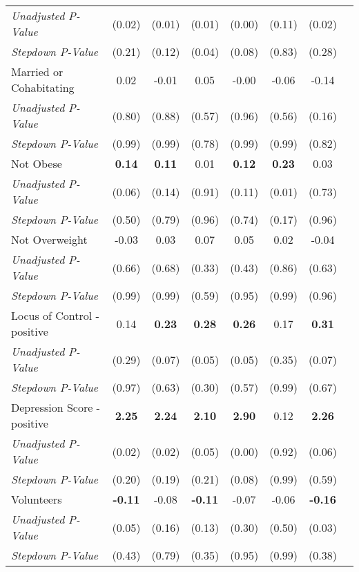 \begin{tabular}{l c c c c c c c}
\quad \textit{Unadjusted P-Value} & (0.02) & (0.01) & (0.01) & (0.00) & (0.11) & (0.02) \\
\quad \textit{Stepdown P-Value} & (0.21) & (0.12) & (0.04) & (0.08) & (0.83) & (0.28) \\
Married or Cohabitating & 0.02 & -0.01 & 0.05 & -0.00 & -0.06 & -0.14 \\
\quad \textit{Unadjusted P-Value} & (0.80) & (0.88) & (0.57) & (0.96) & (0.56) & (0.16) \\
\quad \textit{Stepdown P-Value} & (0.99) & (0.99) & (0.78) & (0.99) & (0.99) & (0.82) \\
Not Obese & \textbf{ 0.14 } & \textbf{ 0.11 } & 0.01 & \textbf{ 0.12 } & \textbf{ 0.23 } & 0.03 \\
\quad \textit{Unadjusted P-Value} & (0.06) & (0.14) & (0.91) & (0.11) & (0.01) & (0.73) \\
\quad \textit{Stepdown P-Value} & (0.50) & (0.79) & (0.96) & (0.74) & (0.17) & (0.96) \\
Not Overweight & -0.03 & 0.03 & 0.07 & 0.05 & 0.02 & -0.04 \\
\quad \textit{Unadjusted P-Value} & (0.66) & (0.68) & (0.33) & (0.43) & (0.86) & (0.63) \\
\quad \textit{Stepdown P-Value} & (0.99) & (0.99) & (0.59) & (0.95) & (0.99) & (0.96) \\
Locus of Control - positive & 0.14 & \textbf{ 0.23 } & \textbf{ 0.28 } & \textbf{ 0.26 } & 0.17 & \textbf{ 0.31 } \\
\quad \textit{Unadjusted P-Value} & (0.29) & (0.07) & (0.05) & (0.05) & (0.35) & (0.07) \\
\quad \textit{Stepdown P-Value} & (0.97) & (0.63) & (0.30) & (0.57) & (0.99) & (0.67) \\
Depression Score - positive & \textbf{ 2.25 } & \textbf{ 2.24 } & \textbf{ 2.10 } & \textbf{ 2.90 } & 0.12 & \textbf{ 2.26 } \\
\quad \textit{Unadjusted P-Value} & (0.02) & (0.02) & (0.05) & (0.00) & (0.92) & (0.06) \\
\quad \textit{Stepdown P-Value} & (0.20) & (0.19) & (0.21) & (0.08) & (0.99) & (0.59) \\
Volunteers & \textbf{ -0.11 } & -0.08 & \textbf{ -0.11 } & -0.07 & -0.06 & \textbf{ -0.16 } \\
\quad \textit{Unadjusted P-Value} & (0.05) & (0.16) & (0.13) & (0.30) & (0.50) & (0.03) \\
\quad \textit{Stepdown P-Value} & (0.43) & (0.79) & (0.35) & (0.95) & (0.99) & (0.38) \\

\end{tabular}
